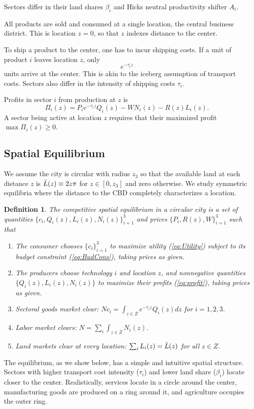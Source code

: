 \documentclass[12pt]{article}
\newtheorem{definition}{Definition}
\begin{document}
Sectors differ in their land shares $\beta_i$ and Hicks neutral productivity shifter $A_i$.

All products are sold and consumed at a single location, the central business district. This is location $z=0$, so that $z$ indexes distance to the center.

To ship a product to the center, one has to incur shipping costs. If a unit of product $i$ leaves location $z$, only
\[
e^{-\tau_i z}
\]
units arrive at the center. This is akin to the iceberg assumption of transport costs. Sectors also differ in the intensity of shipping costs $\tau_i$.

Profits in sector $i$ from production at $z$ is
\begin{equation}
\label{eq:profit}
\Pi_i(z)=P_ie^{-\tau_iz}Q_i(z)-WN_i(z)-R(z)L_i(z).
\end{equation}
A sector being active at location $z$ requires that their maximized profit $\max\Pi_i(z)\geq0.$

\subsection{Spatial Equilibrium}
We assume the city is circular with radius $z_3$ so that the available land at each distance $z$ is $\Bar L(z) \equiv 2z\pi$ for $z\in[0,z_3]$ and zero otherwise. We study symmetric equilibria where the distance to the CBD completely characterizes a location.

\begin{definition}
The competitive spatial equilibrium in a circular city is a set of quantities $\{c_i, Q_i(z), L_i(z), N_i(z)\}_{i=1}^3$ and prices $\{P_i, R(z), W\}_{i=1}^3$ such that
\begin{enumerate}
    \item The consumer chooses $\{c_i\}_{i=1}^3$ to maximize utility (\ref{eq:Utility}) subject to its budget constraint (\ref{eq:BudCons}), taking prices as given.
    \item The producers choose technology $i$ and location $z$, and nonnegative quantities $\{Q_i(z), L_i(z), N_i(z)\}$ to maximize their profits (\ref{eq:profit}), taking prices as given.
    \item Sectoral goods market clear: $Nc_i=\int_{z\in Z} e^{-\tau_iz}Q_i(z)dz$ for $i=1,2,3$.
    \item Labor market clears: $N=\sum_i\int_{z\in Z} N_i(z)$.
    \item Land markets clear at every location: $\sum_iL_i(z)=\Bar L(z)$ for all $z\in Z$.
\end{enumerate}
\end{definition}
The equilibrium, as we show below, has a simple and intuitive spatial structure. Sectors with higher transport cost intensity ($\tau_i$) and lower land share ($\beta_i$) locate closer to the center. Realistically, services locate in a circle around the center, manufacturing goods are produced on a ring around it, and agriculture occupies the outer ring.
\end{document}
